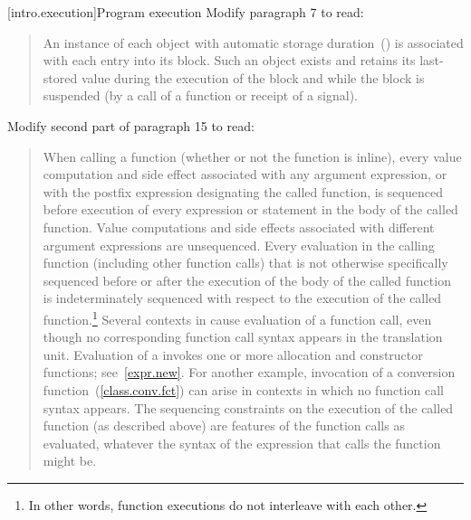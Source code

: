 \setcounter{section}{8}
[intro.execution]{Program execution}
Modify paragraph 7 to read:
\begin{quote}
\setcounter{Paras}{6}
\pnum 
An instance of each object with automatic storage 
duration~() is associated with each entry into its 
block. Such an object exists and retains its last-stored value during 
the execution of the block and while the block is suspended (by a call 
of a function 
or receipt of a signal). 
\end{quote}

Modify second part of paragraph 15 to read:

\begin{quote}
When calling a function (whether or not the function is inline), every
%
value computation and
%
side effect associated with any argument
expression, or with the postfix expression designating the called
function, is sequenced before execution of every expression or statement
in the body of the called function. \enternote
Value computations and
side effects associated with different argument expressions are
unsequenced. \exitnote Every evaluation in the calling function
(including other function calls) that is not otherwise specifically
sequenced before or after the execution of the body of the called
function is indeterminately sequenced with respect to the execution of
the called function.\footnote{In other words, function executions do not interleave with
	each other.}
Several contexts in \Cpp  cause evaluation of a function call, even
though no corresponding function call syntax appears in the translation
unit.
\enterexample
Evaluation of a  invokes one or more allocation
and constructor functions; see~\ref{expr.new}. For another example,
invocation of a conversion function~(\ref{class.conv.fct}) can arise in
contexts in which no function call syntax appears.
\exitexample
The sequencing constraints on the execution of the called function (as
described above) are features of the function calls as evaluated,
whatever the syntax of the expression that calls the function might be.
\end{quote}
